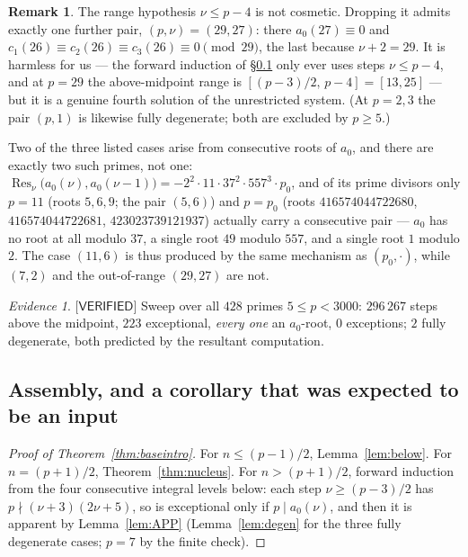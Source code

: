 \documentclass[11pt,reqno]{amsart}
\theoremstyle{plain}
\theoremstyle{definition}
\newtheorem{remark}[theorem]{Remark}
\theoremstyle{remark}
\newtheorem{evidence}[theorem]{Evidence}
\numberwithin{equation}{section}
\newcommand{\Res}{\operatorname{Res}}
\newcommand{\VERIFIED}{\textsf{[VERIFIED]}}
\begin{document}
\begin{remark}
The range hypothesis $\nu\le p-4$ is not cosmetic. Dropping it admits exactly one further pair,
$(p,\nu)=(29,27)$: there $a_0(27)\equiv0$ and $c_1(26)\equiv c_2(26)\equiv c_3(26)\equiv0
\pmod{29}$, the last because $\nu+2=29$. It is harmless for us --- the forward induction of
\S\ref{sec:recstar} only ever uses steps $\nu\le p-4$, and at $p=29$ the above-midpoint range is
$[(p-3)/2,\,p-4]=[13,25]$ --- but it is a genuine fourth solution of the unrestricted system.
(At $p=2,3$ the pair $(p,1)$ is likewise fully degenerate; both are excluded by $p\ge5$.)

Two of the three listed cases arise from consecutive roots of $a_0$, and there are exactly two
such primes, not one: $\Res_\nu\bigl(a_0(\nu),a_0(\nu-1)\bigr)=-2^2\cdot11\cdot37^2\cdot557^3
\cdot p_0$, and of its prime divisors only $p=11$ (roots $5,6,9$; the pair $(5,6)$) and $p=p_0$
(roots $416574044722680$, $416574044722681$, $423023739121937$) actually carry a consecutive
pair --- $a_0$ has no root at all modulo $37$, a single root $49$ modulo $557$, and a single
root $1$ modulo $2$. The case $(11,6)$ is thus produced by the same mechanism as $(p_0,\cdot)$,
while $(7,2)$ and the out-of-range $(29,27)$ are not.
\end{remark}

\begin{evidence}\label{ev:above}
$\VERIFIED$ Sweep over all $428$ primes $5\le p<3000$: $296\,267$ steps above the midpoint,
$223$ exceptional, \emph{every one} an $a_0$-root, $0$ exceptions; $2$ fully degenerate, both
predicted by the resultant computation.
\end{evidence}

\subsection{Assembly, and a corollary that was expected to be an input}\label{sec:recstar}

\begin{proof}[Proof of Theorem~\textup{\ref{thm:baseintro}}]
For $n\le(p-1)/2$, Lemma~\ref{lem:below}. For $n=(p+1)/2$, Theorem~\ref{thm:nucleus}. For
$n>(p+1)/2$, forward induction from the four consecutive integral levels below: each step
$\nu\ge(p-3)/2$ has $p\nmid(\nu+3)(2\nu+5)$, so is exceptional only if $p\mid a_0(\nu)$, and
then it is apparent by Lemma~\ref{lem:APP} (Lemma~\ref{lem:degen} for the three fully
degenerate cases; $p=7$ by the finite check).
\end{proof}
\end{document}
